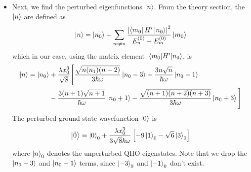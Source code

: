 \documentclass[11pt, a4paper]{article}
\newcommand{\Ham}{Hamiltonian\xspace}
\renewcommand{\t}[1]{\tilde{#1}}
\begin{document}
\begin{itemize}
	Next, we substitute in the energy differences (e.g. $ E^{(0)}_{n} - E^{(0)}_{n-3} $) in the denominators, which are known from the unperturbed \Ham $ H_{0} $, where the energies are equally spaced by $ \hbar \omega $. Substituting in energies and factoring out $ \hbar \omega $ gives
	\begin{align*}
		E_{n} &= E^{(0)}_{n} + \frac{\lambda^{2} x_{0}^{6}}{24 \hbar \omega}\left[n(n-1)(n-2) + 27n^{3} - 27(n+1)^{3} - (n+1)(n+2)(n+3) \right]\\
		& = E^{(0)}_{n} + \frac{\lambda^{2} x_{0}^{6}}{24 \hbar \omega} \left(n^{3}-3n^{2} + 2n + 27n^{3} - 27n^{3} - 81n^{2} - 81n - 27 - n^{3} - 6n^{2} - 11n - 6\right)\\
		&=E^{(0)}_{n} - \frac{\lambda^{2} x_{0}^{6}}{24 \hbar \omega} \left(90n^{2} + 90n + 33\right)\\
		&=E^{(0)}_{n} - \frac{\lambda^{2} x_{0}^{6}}{8 \hbar \omega} \left(30n^{2} + 30n + 11\right)
	\end{align*}
	Note that the energy correction is negative---the perturbed energies $ E_{n} $ are lower than the standard QHO energies $ E^{(0)}_{n} $.
	
	\item Next, we find the perturbed eigenfunctions $ \ket{n} $. From the theory section, the $ \ket{n} $ are defined as
	\begin{equation*}
		\ket{n} = \ket{n_{0}} + \sum_{m\neq n}\frac{\abs{\bra{m_{0}}H'\ket{n_{0}}}^{2}}{E^{(0)}_{n}-E^{(0)}_{m}} \ket{m_{0}}
	\end{equation*}
	which in our case, using the matrix element $ \mel{m_{0}}{H'}{n_{0}}  $, is
	\begin{align*}
		\ket{n} =
		\ket{n_{0}} &+ \frac{\lambda x_{0}^{3}}{\sqrt{8}}\Bigg[\frac{\sqrt{n(n_1)(n-2)}}{3\hbar \omega}\ket{n_{0}-3} + \frac{3n\sqrt{n}}{\hbar \omega}\ket{n_{0}-1} \\
		&- \frac{3(n+1)\sqrt{n+1}}{\hbar \omega}\ket{n_{0}+1} - \frac{\sqrt{(n+1)(n+2)(n+3)}}{3\hbar \omega}\ket{n_{0}+3}\Bigg]
	\end{align*}
	The perturbed ground state wavefunction $ \ket{0} $ is
	\begin{equation*}
		\ket{\t{0}} = \ket{0}_{0} + \frac{\lambda x_{0}^{3}}{3\sqrt{8}\hbar\omega}\left[-9\ket{1}_{0} - \sqrt{6}\ket{3}_{0}\right]
	\end{equation*}
	where $ \ket{n}_{0} $ denotes the unperturbed QHO eigenstates. Note that we drop the $ \ket{n_{0}-3} $ and $ \ket{n_{0}-1} $ terms, since $ \ket{-3}_{0} $ and $ \ket{-1}_{0} $ don't exist.
	

\end{itemize}
\end{document}
